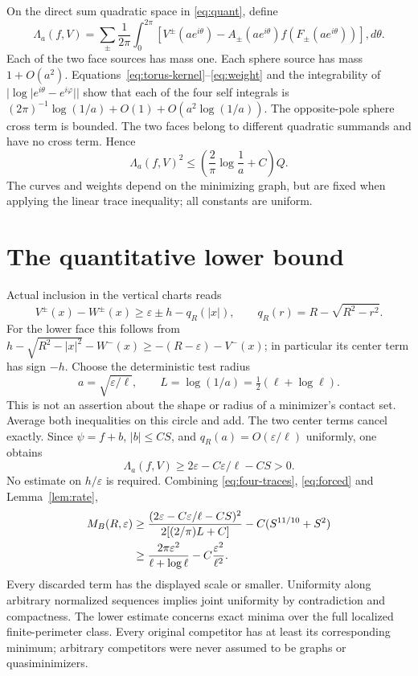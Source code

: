 \documentclass[11pt]{article}
\newcommand{\eps}{\varepsilon}
\theoremstyle{remark}\newtheorem{remark}[theorem]{Remark}
\numberwithin{equation}{section}
\begin{document}
On the direct sum quadratic space in \eqref{eq:quant}, define
\[
 \Lambda_a(f,V)=\sum_\pm\frac1{2\pi}\int_0^{2\pi}
 [V^\pm(ae^{i\theta})-A_\pm(ae^{i\theta})
                      f(F_\pm(ae^{i\theta}))],d\theta.
\]
Each of the two face sources has mass one. Each sphere source has mass
$1+O(a^2)$. Equations~\eqref{eq:torus-kernel}--\eqref{eq:weight}
and the integrability of $|\log|e^{i\theta}-e^{i\varphi}||$ show that
each of the four self integrals is
$(2\pi)^{-1}\log(1/a)+O(1)+O(a^2\log(1/a))$.
The opposite-pole sphere cross term is bounded. The two faces belong
to different quadratic summands and have no cross term. Hence
\begin{equation}
 \Lambda_a(f,V)^2\leq\left(\frac2\pi\log\frac1a+C\right)Q.
 \label{eq:four-traces}
\end{equation}
The curves and weights depend on the minimizing graph, but are fixed
when applying the linear trace inequality; all constants are uniform.

\section{The quantitative lower bound}\label{sec:lower}
Actual inclusion in the vertical charts reads
\begin{equation}
 V^\pm(x)-W^\pm(x)\geq\eps\pm h-q_R(|x|),\qquad
 q_R(r)=R-\sqrt{R^2-r^2}.\label{eq:obstacle}
\end{equation}
For the lower face this follows from
$h-\sqrt{R^2-|x|^2}-W^-(x)\geq-(R-\eps)-V^-(x)$;
in particular its center term has sign $-h$.
Choose the deterministic test radius
\[
 a=\sqrt{\eps/\ell},\qquad L=\log(1/a)=\tfrac12(\ell+\log\ell).
\]
This is not an assertion about the shape or radius of a minimizer's
contact set. Average both inequalities on this circle and add.
The two center terms cancel exactly. Since $\psi=f+b$, $|b|\leq CS$,
and $q_R(a)=O(\eps/\ell)$ uniformly, one obtains
\begin{equation}
 \Lambda_a(f,V)\geq2\eps-C\eps/\ell-CS>0.\label{eq:forced}
\end{equation}
No estimate on $h/\eps$ is required. Combining
\eqref{eq:four-traces}, \eqref{eq:forced} and Lemma~\ref{lem:rate},
\begin{align}
 M_B(R,\eps)&\geq
 \frac{(2\eps-C\eps/\ell-CS)^2}{2[(2/\pi)L+C]}
       -C(S^{11/10}+S^2)\notag\\
 &\geq\frac{2\pi\eps^2}{\ell+\log\ell}
                  -C\frac{\eps^2}{\ell^2}.\label{eq:lower}
\end{align}
Every discarded term has the displayed scale or smaller. Uniformity
along arbitrary normalized sequences implies joint uniformity by
contradiction and compactness. The lower estimate concerns exact minima
over the full localized finite-perimeter class. Every original competitor
has at least its corresponding minimum; arbitrary competitors were never
assumed to be graphs or quasiminimizers.
\end{document}
